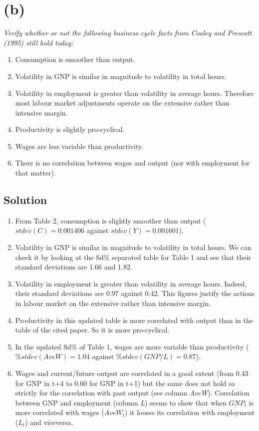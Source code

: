\documentclass[a4paper,10pt]{report}
\begin{document}
\newpage
\section*{(b)}
\textit{Verify whether or not the following business cycle facts from Cooley and Prescott
(1995) still hold today:}
\begin{enumerate}
    \item{Consumption is smoother than output.}
    \item{Volatility in GNP is similar in magnitude to volatility in total hours.}
    \item{Volatility in employment is greater than volatility in average hours. Therefore most labour market adjustments operate on the extensive rather than intensive margin.}
    \item{Productivity is slightly pro-cyclical.}
    \item{Wages are less variable than productivity.}
    \item{There is no correlation between wages and output (nor with employment for that matter).}
\end{enumerate}

\subsection*{Solution}

\begin{enumerate}
    \item From Table 2, consumption is slightly smoother than output ({$stdev(C) = 0.001406$ against $stdev(Y) = 0.001601$}).
    \item Volatility in GNP is similar in magnitude to volatility in total hours. We can check it by looking at the Sd\% separated table for Table 1 and see that their standard deviations are 1.66 and 1.82.
    \item Volatility in employment is greater than volatility in average hours. Indeed, their standard deviations are 0.97 against 0.42. This figures justify the actions in labour market on the extensive rather than intensive margin.
    \item Productivity in this updated table is more correlated with output than in the table of the cited paper. So it is more pro-cyclical.
    \item In the updated Sd\% of Table 1, wages are more variable than productivity ($\%stdev(AveW) = 1.04$ against $\%stdev(GNP/L) = 0.87$).
    \item Wages and current/future output are correlated in a good extent (from 0.43 for GNP in t+4 to 0.60 for GNP in t+1) but the same does not hold so strictly for the correlation with past output (see column \textit{AveW}).
    Correlation between GNP and employment (column \textit{L}) seems to show that when $GNP_{t}$ is more correlated with wages ($AveW_{t}$) it looses its correlation with employment ($L_{t}$) and viceversa.
\end{enumerate}
\end{document}
